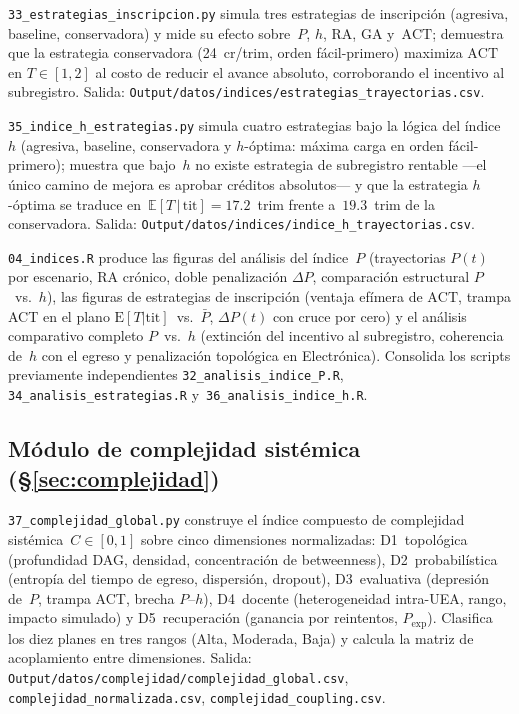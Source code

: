 \documentclass[11pt,letterpaper]{article}
\newcommand{\ETtit}{\mathbb{E}[T\,|\,\mathrm{tit}]}
\begin{document}
\begin{sloppypar}
\texttt{33\_estrategias\_inscripcion.py}
simula tres estrategias de inscripción (agresiva, baseline, conservadora) y
mide su efecto sobre~$P$, $h$, $\mathrm{RA}$, $\mathrm{GA}$ y~$\mathrm{ACT}$;
demuestra que la estrategia conservadora (24~cr/trim, orden fácil-primero)
maximiza $\mathrm{ACT}$ en $T\in[1,2]$ al costo de reducir el avance absoluto,
corroborando el incentivo al subregistro.
Salida: \texttt{Output/datos/indices/estrategias\_trayectorias.csv}.

\texttt{35\_indice\_h\_estrategias.py}
simula cuatro estrategias bajo la lógica del índice~$h$ (agresiva, baseline,
conservadora y $h$-óptima: máxima carga en orden fácil-primero);
muestra que bajo~$h$ no existe estrategia de subregistro rentable
---el único camino de mejora es aprobar créditos absolutos--- y que
la estrategia $h$-óptima se traduce en~$\ETtit=17.2$~trim frente a~$19.3$~trim
de la conservadora.
Salida: \texttt{Output/datos/indices/indice\_h\_trayectorias.csv}.

\texttt{04\_indices.R}
produce las figuras del análisis del índice~$P$ (trayectorias $P(t)$ por escenario,
$\mathrm{RA}$ crónico, doble penalización $\Delta P$, comparación estructural
$P$~vs.~$h$), las figuras de estrategias de inscripción (ventaja efímera de
$\mathrm{ACT}$, trampa ACT en el plano $\mathrm{E}[T|\text{tit}]$~vs.~$\bar{P}$,
$\Delta P(t)$ con cruce por cero) y el análisis comparativo completo
$P$~vs.~$h$ (extinción del incentivo al subregistro, coherencia de~$h$ con el
egreso y penalización topológica en Electrónica).
Consolida los scripts previamente independientes
\texttt{32\_analisis\_indice\_P.R}, \texttt{34\_analisis\_estrategias.R}
y~\texttt{36\_analisis\_indice\_h.R}.

\subsection{Módulo de complejidad sistémica (\S\ref{sec:complejidad})}

\texttt{37\_complejidad\_global.py}
construye el índice compuesto de complejidad sistémica~$C\in[0,1]$ sobre
cinco dimensiones normalizadas: D1~topológica (profundidad DAG, densidad,
concentración de betweenness), D2~probabilística (entropía del tiempo de
egreso, dispersión, dropout), D3~evaluativa (depresión de~$P$, trampa ACT,
brecha $P$--$h$), D4~docente (heterogeneidad intra-UEA, rango, impacto
simulado) y D5~recuperación (ganancia por reintentos,
$P_{\mathrm{exp}}$).
Clasifica los diez planes en tres rangos (Alta, Moderada, Baja) y
calcula la matriz de acoplamiento entre dimensiones.
Salida: \texttt{Output/datos/complejidad/complejidad\_global.csv},
        \texttt{complejidad\_normalizada.csv}, \texttt{complejidad\_coupling.csv}.


\end{sloppypar}
\end{document}
